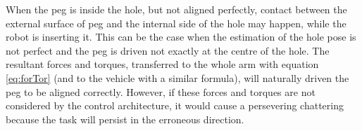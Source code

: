 When the peg is inside the hole, but not aligned perfectly, contact between the external surface of peg and the internal side of the hole may happen, while the robot is inserting it. This can be the case when the estimation of the hole pose is not perfect and the peg is driven not exactly at the centre of the hole.
The resultant forces and torques, transferred to the whole arm with equation \eqref{eq:forTor} (and to the vehicle with a similar formula), will naturally driven the peg to be aligned correctly. However, if these forces and torques are not considered by the control architecture, it would cause a persevering chattering because the task will persist in the erroneous direction.\\ %


